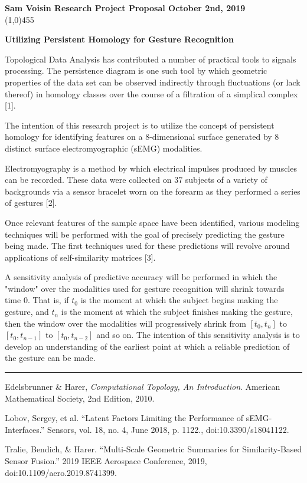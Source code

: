 \documentclass[11pt]{article}
\begin{document}
\noindent \textbf{Sam Voisin \hfill  \textbf{Research Project Proposal}  \hfill  October 2nd, 2019} \\
\line(1,0){455}

\begin{center}
\Large{{\bf Utilizing Persistent Homology for Gesture Recognition}}\\
\end{center}
Topological Data Analysis has contributed a number of practical tools to signals processing. The persistence diagram is one such tool by which geometric properties of the data set can be observed indirectly through fluctuations (or lack thereof) in homology classes over the course of a filtration of a simplical complex [1].

The intention of this research project is to utilize the concept of persistent homology for identifying features on a $8$-dimensional surface generated by $8$ distinct surface electromyographic (sEMG) modalities.

Electromyography is a method by which electrical impulses produced by muscles can be recorded. These data were collected on $37$ subjects of a variety of backgrounds via a sensor bracelet worn on the forearm as they performed a series of gestures [2].

Once relevant features of the sample space have been identified, various modeling techniques will be performed with the goal of precisely predicting the gesture being made. The first techniques used for these predictions will revolve around applications of self-similarity matrices [3].

A sensitivity analysis of predictive accuracy will be performed in which the "window" over the modalities used for gesture recognition will shrink towards time $0$. That is, if $t_0$ is the moment at which the subject begins making the gesture, and $t_n$ is the moment at which the subject finishes making the gesture, then the window over the modalities will progressively shrink from $[t_0, t_n]$ to $[t_0, t_{n-1}]$ to $[t_0, t_{n-2}]$ and so on. The intention of this sensitivity analysis is to develop an understanding of the earliest point at which a reliable prediction of the gesture can be made.
\begin{center}
\noindent\rule{16cm}{0.4pt}
\end{center}
\begin{thebibliography}{5}

 Edelsbrunner \& Harer, \emph{Computational Topology, An Introduction}. American Mathematical Society, 2nd Edition, 2010.

 Lobov, Sergey, et al. “Latent Factors Limiting the Performance of sEMG-Interfaces.” Sensors, vol. 18, no. 4, June 2018, p. 1122., doi:10.3390/s18041122.

 Tralie, Bendich, \& Harer. “Multi-Scale Geometric Summaries for Similarity-Based Sensor Fusion.” 2019 IEEE Aerospace Conference, 2019, doi:10.1109/aero.2019.8741399.

\end{thebibliography}
  
\end{document}
